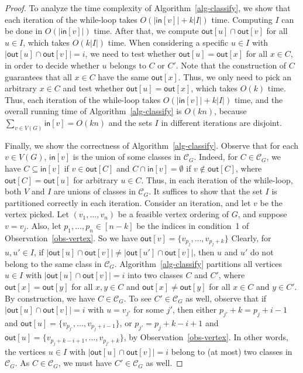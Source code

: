 \documentclass[english]{lipics-v2021}
\begin{document}
\begin{proof}
To analyze the time complexity of Algorithm~\ref{alg-classify}, we show that each iteration of the while-loop takes $O(|\mathsf{in}[v]|+k|I|)$ time.
Computing $I$ can be done in $O(|\mathsf{in}[v]|)$ time.
After that, we compute $\mathsf{out}[u] \cap \mathsf{out}[v]$ for all $u \in I$, which takes $O(k|I|)$ time.
When considering a specific $u \in I$ with $|\mathsf{out}[u] \cap \mathsf{out}[v]| = i$, we need to test whether $\mathsf{out}[u] = \mathsf{out}[x]$ for all $x \in C$, in order to decide whether $u$ belongs to $C$ or $C'$.
Note that the construction of $C$ guarantees that all $x \in C$ have the same $\mathsf{out}[x]$.
Thus, we only need to pick an arbitrary $x \in C$ and test whether $\mathsf{out}[u] = \mathsf{out}[x]$, which takes $O(k)$ time.
Thus, each iteration of the while-loop takes $O(|\mathsf{in}[v]|+k|I|)$ time, and the overall running time of Algorithm~\ref{alg-classify} is $O(kn)$, because $\sum_{v \in V(G)} \mathsf{in}[v] = O(kn)$ and the sets $I$ in different iterations are disjoint.

Finally, we show the correctness of Algorithm~\ref{alg-classify}.
Observe that for each $v \in V(G)$, $\mathsf{in}[v]$ is the union of some classes in $\mathcal{C}_G$.
Indeed, for $C \in \mathcal{C}_G$, we have $C \subseteq \mathsf{in}[v]$ if $v \in \mathsf{out}[C]$ and $C \cap \mathsf{in}[v] = \emptyset$ if $v \not\in \mathsf{out}[C]$, where $\mathsf{out}[C] = \mathsf{out}[u]$ for arbitrary $u \in C$.
Thus, in each iteration of the while-loop, both $V$ and $I$ are unions of classes in $\mathcal{C}_G$.
It suffices to show that the set $I$ is partitioned correctly in each iteration.
Consider an iteration, and let $v$ be the vertex picked.
Let $(v_1,\dots,v_n)$ be a feasible vertex ordering of $G$, and suppose $v = v_j$.
Also, let $p_1,\dots,p_n \in [n-k]$ be the indices in condition~1 of Observation~\ref{obs-vertex}.
So we have $\mathsf{out}[v] = \{v_{p_j},\dots,v_{p_j+k}\}$
Clearly, for $u,u' \in I$, if $|\mathsf{out}[u] \cap \mathsf{out}[v]| \neq |\mathsf{out}[u'] \cap \mathsf{out}[v]|$, then $u$ and $u'$ do not belong to the same class in $\mathcal{C}_G$.
Algorithm~\ref{alg-classify} partitions all vertices $u \in I$ with $|\mathsf{out}[u] \cap \mathsf{out}[v]| = i$ into two classes $C$ and $C'$, where $\mathsf{out}[x] = \mathsf{out}[y]$ for all $x,y \in C$ and $\mathsf{out}[x] \neq \mathsf{out}[y]$ for all $x \in C$ and $y \in C'$.
By construction, we have $C \in \mathcal{C}_G$.
To see $C' \in \mathcal{C}_G$ as well, observe that if $|\mathsf{out}[u] \cap \mathsf{out}[v]| = i$ with $u = v_{j'}$ for some $j'$, then either $p_{j'} + k = p_j + i - 1$ and $\mathsf{out}[u] = \{v_{p_{j'}},\dots,v_{p_j+i-1}\}$, or $p_{j'} = p_j + k - i + 1$ and $\mathsf{out}[u] = \{v_{p_j+k-i+1},\dots,v_{p_{j'}+k}\}$, by Observation~\ref{obs-vertex}.
In other words, the vertices $u \in I$ with $|\mathsf{out}[u] \cap \mathsf{out}[v]| = i$ belong to (at most) two classes in $\mathcal{C}_G$.
As $C \in \mathcal{C}_G$, we must have $C' \in \mathcal{C}_G$ as well.
\end{proof}
\end{document}
